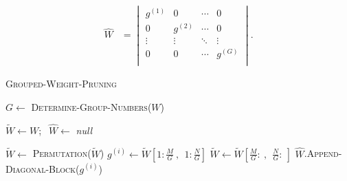     \begin{equation}\label{eq:grouped}
    \begin{aligned}
        \widehat{W} &=\begin{vmatrix}
        g^{(1)}& 0 & \cdots & 0 \\
        0 & g^{(2)} & \cdots  & 0 \\
        \vdots & \vdots  & \ddots  & \vdots  \\
        0 & 0 & \cdots  & g^{(G)} \\
        \end{vmatrix}.
    \end{aligned}
    \end{equation}

\begin{algorithm}[t!]
\DontPrintSemicolon
	{
 
        \small
		\caption{\small \textsc{Grouped-Weight-Pruning}}\label{alg:prune}
     
        $G \leftarrow$ \textsc{Determine-Group-Numbers}($W$)\;
  
		$\widetilde{W}\leftarrow W$; $~~\widehat{W}\leftarrow$ \textit{null}\;
		{
            
            
                $\widetilde{W}\leftarrow$ \textsc{Permutation}($\widetilde{W}$)\;
			    $g^{(i)} \leftarrow \widetilde{W}[1:\frac{M}{G}~,~~1:\frac{N}{G}]$\;
                $\widetilde{W} \leftarrow \widetilde{W}[\frac{M}{G}:~,~~\frac{N}{G}:~]$\;
                $\widehat{W}$.\textsc{Append-Diagonal-Block}($g^{(i)}$)\;
            
		}
        \;
    
 }
\end{algorithm}


